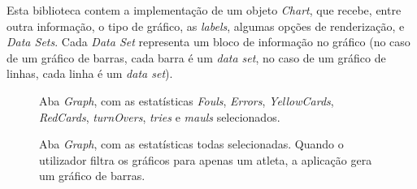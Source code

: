 Esta biblioteca contem a implementação de um objeto \textit{Chart}, que recebe, entre outra informação, o tipo de gráfico, as \textit{labels}, algumas opções de renderização, e \textit{Data Sets}. Cada \textit{Data Set} representa um bloco de informação no gráfico (no caso de um gráfico de barras, cada barra é um \textit{data set}, no caso de um gráfico de linhas, cada linha é um \textit{data set}).

\begin{figure}[h]
	\begin{center}
	\end{center}
	\caption{Aba \textit{Graph}, com as estatísticas \textit{Fouls}, \textit{Errors}, \textit{YellowCards}, \textit{RedCards}, \textit{turnOvers}, \textit{tries} e \textit{mauls} selecionados.}\label{fig:athleteprofile}
\end{figure}

\begin{figure}[h]
	\begin{center}
	\end{center}
	\caption{Aba \textit{Graph}, com as estatísticas todas selecionadas. Quando o utilizador filtra os gráficos para apenas um atleta, a aplicação gera um gráfico de barras.}\label{fig:athleteprofile}
\end{figure}